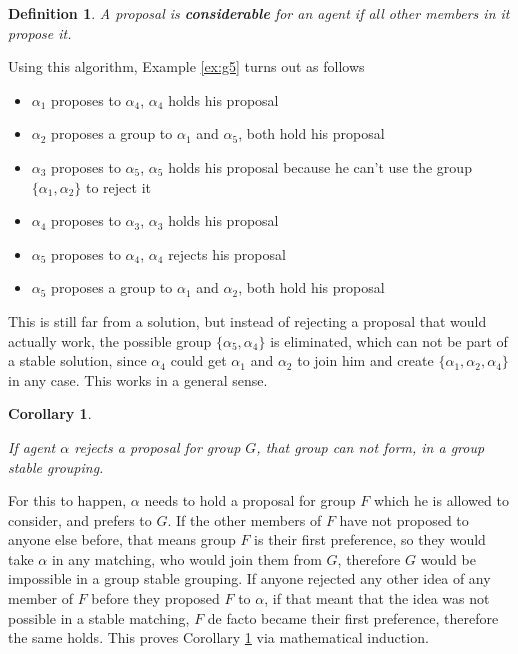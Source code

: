 \documentclass{elsarticle}
\newtheorem{mydef}{Definition}
\newtheorem{mysta}{Corollary}
\begin{document}
\begin{mydef}
\label{def:cons}
A proposal is \textbf{considerable} for an agent if all other members in it propose it.
\end{mydef}


\AlgBasicReduction

Using this algorithm, Example \ref{ex:g5} turns out as follows

\begin{itemize}
\item $\alpha_1$ proposes to $\alpha_4$, $\alpha_4$ holds his proposal
\item $\alpha_2$ proposes a group to $\alpha_1$ and $\alpha_5$, both hold his proposal
\item $\alpha_3$ proposes to $\alpha_5$, $\alpha_5$ holds his proposal because he can't use the group $\{ \alpha_1 , \alpha_2 \}$ to reject it
\item $\alpha_4$ proposes to $\alpha_3$, $\alpha_3$ holds his proposal
\item $\alpha_5$ proposes to $\alpha_4$, $\alpha_4$ rejects his proposal
\item $\alpha_5$ proposes a group to $\alpha_1$ and $\alpha_2$, both hold his proposal
\end{itemize}

This is still far from a solution, but instead of rejecting a proposal that would actually work, the possible group $ \{ \alpha_5 , \alpha_4 \}$ is eliminated, which can not be part of a stable solution, since $\alpha_4$ could get $\alpha_1$ and $\alpha_2$ to join him and create $\{ \alpha_1 , \alpha_2 , \alpha_4 \}$ in any case. This works in a general sense.

\begin{mysta}
\label{sta:rej}

If agent $\alpha$ rejects a proposal for group $G$, that group can not form, in a group stable grouping.

\end{mysta}

For this to happen, $\alpha$ needs to hold a proposal for group $F$ which he is allowed to consider, and prefers to $G$. If the other members of $F$ have not proposed to anyone else before, that means group $F$ is their first preference, so they would take $\alpha$ in any matching, who would join them from $G$, therefore $G$ would be impossible in a group stable grouping. If anyone rejected any other idea of any member of $F$ before they proposed $F$ to $\alpha$, if that meant that the idea was not possible in a stable matching, $F$ de facto became their first preference, therefore the same holds. This proves Corollary \ref{sta:rej} via mathematical induction.
\end{document}
